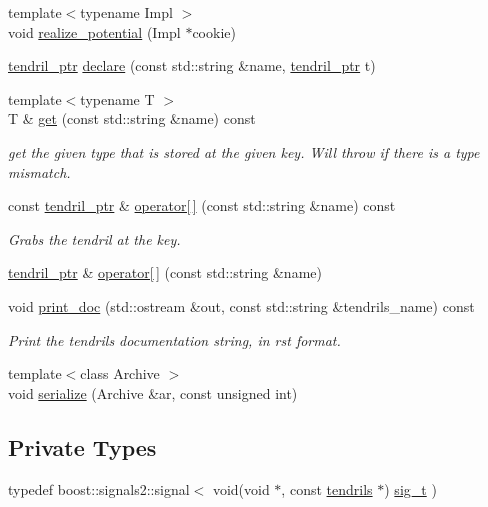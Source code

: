 \begin{DoxyCompactItemize}
\item 
{\footnotesize template$<$typename Impl $>$ }\\void \hyperlink{classecto_1_1tendrils_a1072755c7df91725bcabb7dc65db103b}{realize\-\_\-potential} (\-Impl $\ast$cookie)
\item 
\hyperlink{namespaceecto_a84fb5f6130275382e5cbeb5fdececa78}{tendril\-\_\-ptr} \hyperlink{classecto_1_1tendrils_aa32bcd230653775b655b63a415a349eb}{declare} (const std\-::string \&name, \hyperlink{namespaceecto_a84fb5f6130275382e5cbeb5fdececa78}{tendril\-\_\-ptr} t)
\item 
{\footnotesize template$<$typename T $>$ }\\\-T \& \hyperlink{classecto_1_1tendrils_a43aea6bf46edc5921a9768838b9fbe93}{get} (const std\-::string \&name) const 
\begin{DoxyCompactList}\small\item\em get the given type that is stored at the given key. \-Will throw if there is a type mismatch. \end{DoxyCompactList}\item 
const \hyperlink{namespaceecto_a84fb5f6130275382e5cbeb5fdececa78}{tendril\-\_\-ptr} \& \hyperlink{classecto_1_1tendrils_a2462fa379fff3d0f81afa8eb40d45624}{operator\mbox{[}$\,$\mbox{]}} (const std\-::string \&name) const 
\begin{DoxyCompactList}\small\item\em \-Grabs the tendril at the key. \end{DoxyCompactList}\item 
\hyperlink{namespaceecto_a84fb5f6130275382e5cbeb5fdececa78}{tendril\-\_\-ptr} \& \hyperlink{classecto_1_1tendrils_a774ab854c749359953b44ffdaa62456c}{operator\mbox{[}$\,$\mbox{]}} (const std\-::string \&name)
\item 
void \hyperlink{classecto_1_1tendrils_a3e29152c1c0979cf02219d0e02b8fb5e}{print\-\_\-doc} (std\-::ostream \&out, const std\-::string \&tendrils\-\_\-name) const 
\begin{DoxyCompactList}\small\item\em \-Print the tendrils documentation string, in rst format. \end{DoxyCompactList}\item 
{\footnotesize template$<$class Archive $>$ }\\void \hyperlink{classecto_1_1tendrils_aa9839d00f20cf2a3b87c0cbf19864a4f}{serialize} (\-Archive \&ar, const unsigned int)
\end{DoxyCompactItemize}
\subsection*{\-Private \-Types}
\begin{DoxyCompactItemize}
\item 
typedef \*
boost\-::signals2\-::signal$<$ void(void \*
$\ast$, const \hyperlink{classecto_1_1tendrils}{tendrils} $\ast$) \hyperlink{classecto_1_1tendrils_aa898408b75690dffde72989cdeaf03e6}{sig\-\_\-t} )
\end{DoxyCompactItemize}
